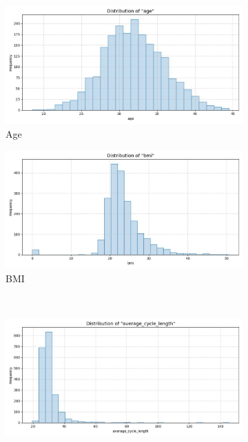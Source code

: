 \documentclass[11pt]{article}
\begin{document}
\begin{figure}[h]
  \centering
  \begin{subfigure}{0.45\textwidth}
    \includegraphics[width=\linewidth]{plots/age.jpg}
    \caption{Age}
    \label{fig:dist_age}
  \end{subfigure}
  \hfill
  \begin{subfigure}{0.45\textwidth}
    \includegraphics[width=\linewidth]{plots/bmi.jpg}
    \caption{BMI}
    \label{fig:dist_bmi}
  \end{subfigure}
  \\
  \vspace{0.5em}
  \begin{subfigure}{0.45\textwidth}
    \includegraphics[width=\linewidth]{plots/average_cycle_length.jpg}

\end{subfigure}
\end{figure}
\end{document}
